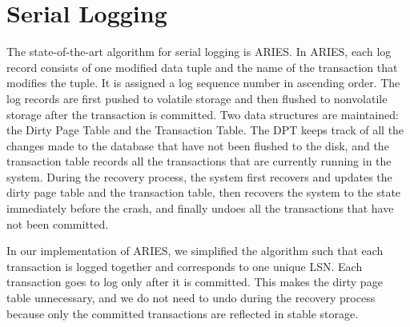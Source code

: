 \section{Serial Logging}

The state-of-the-art algorithm for serial logging is ARIES. In ARIES, each log record consists of one modified data tuple and the name of the transaction that modifies the tuple. It is assigned a log sequence number in ascending order. The log records are first pushed to volatile storage and then flushed to nonvolatile storage after the transaction is committed. Two data structures are maintained: the Dirty Page Table and the Transaction Table. The DPT keeps track of all the changes made to the database that have not been flushed to the disk, and the transaction table records all the transactions that are currently running in the system. During the recovery process, the system first recovers and updates the dirty page table and the transaction table, then recovers the system to the state immediately before the crash, and finally undoes all the transactions that have not been committed.\par
In our implementation of ARIES, we simplified the algorithm such that each transaction is logged together and corresponds to one unique LSN. Each transaction goes to log only after it is committed. This makes the dirty page table unnecessary, and we do not need to undo during the recovery process because only the committed transactions are reflected in stable storage. \par

